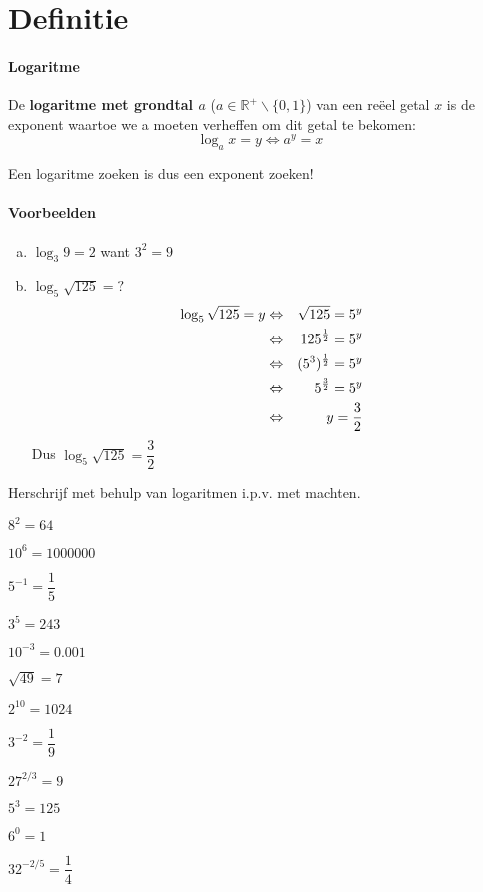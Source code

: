 \documentclass[12pt,twoside,a4paper]{article}
\begin{document}
\thispagestyle{empty}
\newpage

\tableofcontents
\thispagestyle{empty}
\newpage


\pagestyle{fancy}
\fancyhead[RE,LO]{}

\cleardoublepage
\section{Definitie}

\paragraph{Logaritme}
\begin{mdframed}
De {\bf logaritme met grondtal $a$} ($a\in\mathbb{R}^+\backslash\{0,1\}$) van een reëel getal $x$ is de exponent waartoe we a moeten verheffen om dit getal te bekomen:
$$\log_a x = y \Leftrightarrow a^y=x$$
\end{mdframed}

Een logaritme zoeken is dus een exponent zoeken!

\paragraph{Voorbeelden}
\begin{enumerate}[(a)]
  \item $\log_3 9 = 2$ want $3^2=9$
  \item $\log_5\sqrt{125} = ?$
  \begin{eqnarray*}
    \log_5\sqrt{125}=y &\Leftrightarrow& \sqrt{125} = 5^y\\
                       &\Leftrightarrow& 125^\frac{1}{2} = 5^y\\
                       &\Leftrightarrow& (5^3)^\frac{1}{2} = 5^y\\
                       &\Leftrightarrow& 5^\frac{3}{2} = 5^y\\
                       &\Leftrightarrow& y=\frac{3}{2}
  \end{eqnarray*}
  Dus $\log_5\sqrt{125} = \dfrac{3}{2}$
\end{enumerate}

\begin{oefening} %
Herschrijf met behulp van logaritmen i.p.v. met machten.
\begin{exlist}{2}
  \item $8^2=64$
  \item $10^6=1000000$
  \item $5^{-1}=\dfrac{1}{5}$
  \item $3^5=243$
  \item $10^{-3}=0.001$
  \item $\sqrt{49}=7$
  \item $2^{10}=1024$
  \item $3^{-2}=\dfrac{1}{9}$
  \item $27^{2/3}=9$
  \item $5^3=125$
  \item $6^0=1$
  \item $32^{-2/5}=\dfrac{1}{4}$
\end{exlist}
\end{oefening}
\end{document}
